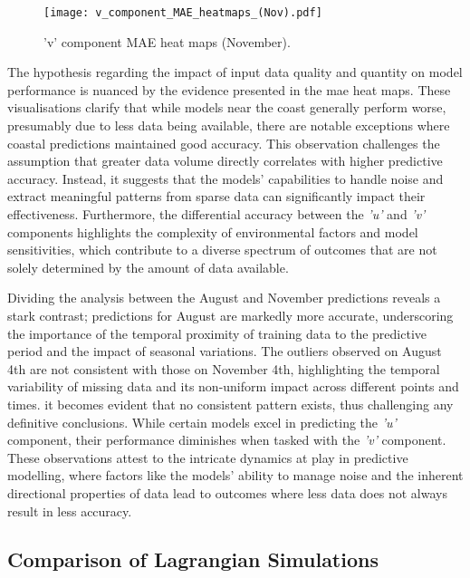 \begin{figure}[htbp]
    \centering
    \texttt{[image: v\_component\_MAE\_heatmaps\_(Nov).pdf]}
    \caption[Short sample caption.]{'v' component MAE heat maps (November).\label{fig_4.5}}
\end{figure}

The hypothesis regarding the impact of input data quality and quantity on model performance is nuanced by the evidence presented in the \acrshort{mae} heat maps. These visualisations clarify that while models near the coast generally perform worse, presumably due to less data being available, there are notable exceptions where coastal predictions maintained good accuracy. This observation challenges the assumption that greater data volume directly correlates with higher predictive accuracy. Instead, it suggests that the models' capabilities to handle noise and extract meaningful patterns from sparse data can significantly impact their effectiveness. Furthermore, the differential accuracy between the \textit{'u'} and \textit{'v'} components highlights the complexity of environmental factors and model sensitivities, which contribute to a diverse spectrum of outcomes that are not solely determined by the amount of data available.

Dividing the analysis between the August and November predictions reveals a stark contrast; predictions for August are markedly more accurate, underscoring the importance of the temporal proximity of training data to the predictive period and the impact of seasonal variations. The outliers observed on August 4th are not consistent with those on November 4th, highlighting the temporal variability of missing data and its non-uniform impact across different points and times. it becomes evident that no consistent pattern exists, thus challenging any definitive conclusions. While certain models excel in predicting the \textit{'u'} component, their performance diminishes when tasked with the \textit{'v'} component. These observations attest to the intricate dynamics at play in predictive modelling, where factors like the models' ability to manage noise and the inherent directional properties of data lead to outcomes where less data does not always result in less accuracy.

\subsection{Comparison of Lagrangian Simulations }
\label{subsec:4.2.3}

